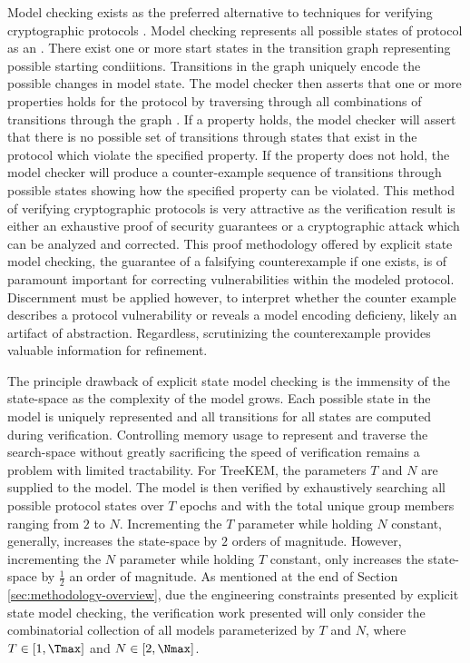 Model checking exists as the preferred alternative to  techniques for verifying cryptographic protocols \autocite{kacprzak2006comparing, lomuscio2007verification, van2004symbolic}.
Model checking represents all possible states of protocol as an  \autocite{clarke1981design}.
There exist one or more start states in the transition graph representing possible starting condiitions.
Transitions in the graph uniquely encode the possible changes in model state.
The model checker then asserts that one or more properties holds for the protocol by traversing through all combinations of transitions through the graph \autocite{Vardi1986}.
If a property holds, the model checker will assert that there is no possible set of transitions through states that exist in the protocol which violate the specified property.
If the property does not hold, the model checker will produce a counter-example sequence of transitions through possible states showing how the specified property can be violated.
This method of verifying cryptographic protocols is very attractive as the verification result is either an exhaustive proof of security guarantees or a cryptographic attack which can be analyzed and corrected.
This proof methodology offered by explicit state model checking, the guarantee of a falsifying counterexample if one exists, is of paramount important for correcting vulnerabilities within the modeled protocol.
Discernment must be applied however, to interpret whether the counter example describes a protocol vulnerability or reveals a model encoding deficieny, likely an artifact of abstraction.
Regardless, scrutinizing the counterexample provides valuable information for refinement.

The principle drawback of explicit state model checking is the immensity of the state-space as the complexity of the model grows.
Each possible state in the model is uniquely represented and all transitions for all states are computed during verification.
Controlling memory usage to represent and traverse the search-space without greatly sacrificing the speed of verification remains a problem with limited tractability.
For TreeKEM, the parameters \(T\) and \(N\) are supplied to the model.
The model is then verified by exhaustively searching all possible protocol states over \(T\) epochs and with the total unique group members ranging from \(2\) to \(N\).
Incrementing the \(T\) parameter while holding \(N\) constant, generally, increases the state-space by \(2\) orders of magnitude.
However, incrementing the \(N\) parameter while holding \(T\) constant, only increases the state-space by \(\frac{1}{2}\) an order of magnitude.
As mentioned at the end of Section \ref{sec:methodology-overview}, due the engineering constraints presented by explicit state model checking, the verification work presented will only consider the combinatorial collection of all models parameterized by \(T\) and \(N\), where \(T \in [1, \Tmax]\) and \(N \in [2, \Nmax]\).


